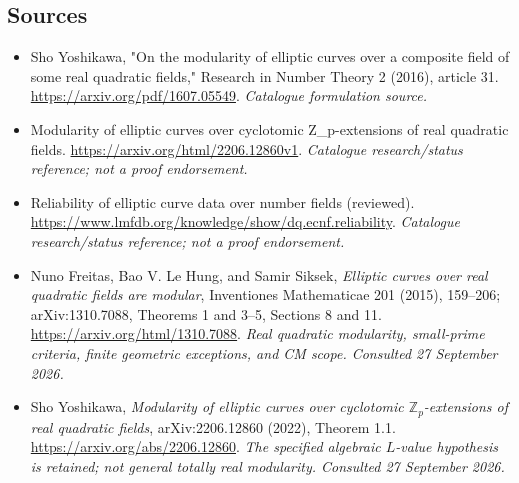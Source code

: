 \documentclass[11pt,a4paper]{article}
\newcommand{\Z}{\mathbb{Z}}
\numberwithin{equation}{section}
\begin{document}
\subsection{Sources}
\begin{itemize}\raggedright
\item[\textnormal{[S1]}]\hypertarget{source:67:1}{} Sho Yoshikawa, "On the modularity of elliptic curves over a composite field of some real quadratic fields," Research in Number Theory 2 (2016), article 31.
\url{https://arxiv.org/pdf/1607.05549}.
{\small\textit{Catalogue formulation source.}}
\item[\textnormal{[S2]}]\hypertarget{source:67:2}{} Modularity of elliptic curves over cyclotomic Z\_p-extensions of real quadratic fields.
\url{https://arxiv.org/html/2206.12860v1}.
{\small\textit{Catalogue research/status reference; not a proof endorsement.}}
\item[\textnormal{[S3]}]\hypertarget{source:67:3}{} Reliability of elliptic curve data over number fields (reviewed).
\url{https://www.lmfdb.org/knowledge/show/dq.ecnf.reliability}.
{\small\textit{Catalogue research/status reference; not a proof endorsement.}}

\item[\textnormal{[E1]}]\hypertarget{extra:67:1}{} Nuno Freitas, Bao V. Le Hung, and Samir Siksek, \emph{Elliptic curves over real quadratic fields are modular}, Inventiones Mathematicae 201 (2015), 159--206; arXiv:1310.7088, Theorems 1 and 3--5, Sections 8 and 11.
\url{https://arxiv.org/html/1310.7088}.
{\small\textit{Real quadratic modularity, small-prime criteria, finite geometric exceptions, and CM scope. Consulted 27 September 2026.}}
\item[\textnormal{[E2]}]\hypertarget{extra:67:2}{} Sho Yoshikawa, \emph{Modularity of elliptic curves over cyclotomic $\Z_p$-extensions of real quadratic fields}, arXiv:2206.12860 (2022), Theorem 1.1.
\url{https://arxiv.org/abs/2206.12860}.
{\small\textit{The specified algebraic $L$-value hypothesis is retained; not general totally real modularity. Consulted 27 September 2026.}}
\end{itemize}
\end{document}
